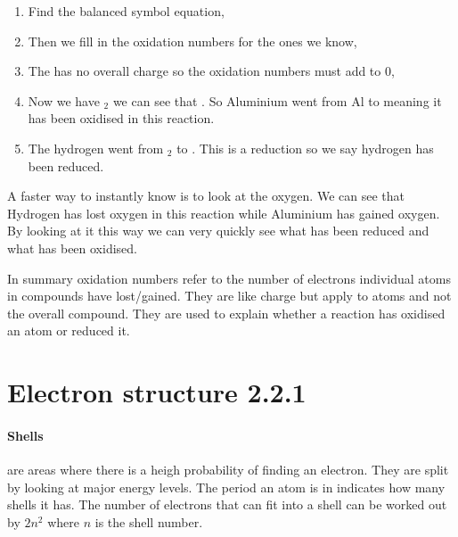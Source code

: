 	\begin{enumerate}
		\item Find the balanced symbol equation,
		
		
		\item Then we fill in the oxidation numbers for the ones we know,
		
		 
		\item The  has no overall charge so the oxidation numbers must add to 0,
		
		
		\item Now we have $_2$ we can see that . So Aluminium went from Al to  meaning it has been oxidised in this reaction.
		
		\item The hydrogen went from $_2$ to . This is a reduction so we say hydrogen has been reduced.
	\end{enumerate}
	
	A faster way to instantly know is to look at the oxygen. We can see that Hydrogen has lost oxygen in this reaction while Aluminium has gained oxygen. By looking at it this way we can very quickly see what has been reduced and what has been oxidised.
	
	In summary oxidation numbers refer to the number of electrons individual atoms in compounds have lost/gained. They are like charge but apply to atoms and not the overall compound. They are used to explain whether a reaction has oxidised an atom or reduced it.
	
\section{Electron structure 2.2.1}

	\paragraph{Shells} are areas where there is a heigh probability of finding an electron. They are split by looking at major energy levels. The period an atom is in indicates how many shells it has. The number of electrons that can fit into a shell can be worked out by $2n^2$ where $n$ is the shell number.
	
